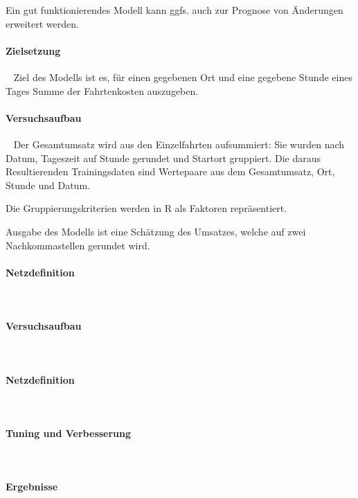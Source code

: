 Ein gut funktionierendes Modell kann ggfs. auch zur Prognose von Änderungen erweitert werden.
\paragraph{Zielsetzung} ~\newline
Ziel des Modells ist es, für einen gegebenen Ort und eine gegebene Stunde eines Tages Summe der Fahrtenkosten auszugeben. 

\paragraph{Versuchsaufbau} ~\newline
Der Gesamtumsatz wird aus den Einzelfahrten aufsummiert: Sie wurden nach Datum, Tageszeit auf Stunde gerundet und Startort gruppiert. Die daraus Resultierenden Trainingsdaten sind Wertepaare aus dem Gesamtumsatz, Ort, Stunde und Datum. 

Die Gruppierungskriterien werden in R als Faktoren repräsentiert. 

Ausgabe des Modells ist eine Schätzung des Umsatzes, welche auf zwei Nachkommastellen gerundet wird. 

\paragraph{Netzdefinition} ~\newline

\paragraph{Versuchsaufbau} ~\newline

\paragraph{Netzdefinition} ~\newline

\paragraph{Tuning und Verbesserung} ~\newline

\paragraph{Ergebnisse} ~\newline
